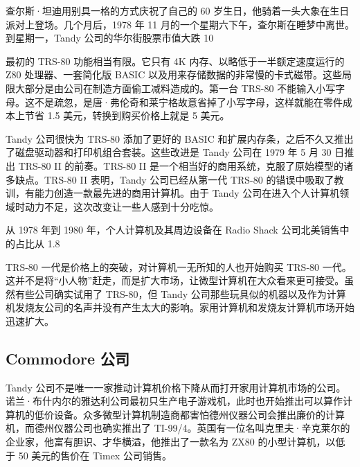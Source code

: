 \documentclass[12pt,UTF8]{ctexbook}
\begin{document}
查尔斯·坦迪用别具一格的方式庆祝了自己的 60 岁生日，他骑着一头大象在生日派对上登场。几个月后，1978 年 11 月的一个星期六下午，查尔斯在睡梦中离世。到星期一，Tandy 公司的华尔街股票市值大跌 10%

最初的 TRS-80 功能相当有限。它只有 4K 内存、以略低于一半额定速度运行的 Z80 处理器、一套简化版 BASIC 以及用来存储数据的非常慢的卡式磁带。这些局限大部分是由公司在制造方面偷工减料造成的。第一台 TRS-80 不能输入小写字母。这不是疏忽，是唐·弗伦奇和莱宁格故意省掉了小写字母，这样就能在零件成本上节省 1.5 美元，转换到购买价格上就是 5 美元。

Tandy 公司很快为 TRS-80 添加了更好的 BASIC 和扩展内存条，之后不久又推出了磁盘驱动器和打印机组合套装。这些改进是 Tandy 公司在 1979 年 5 月 30 日推出 TRS-80 II 的前奏。TRS-80 II 是一个相当好的商用系统，克服了原始模型的诸多缺点。TRS-80 II 表明，Tandy 公司已经从第一代 TRS-80 的错误中吸取了教训，有能力创造一款最先进的商用计算机。由于 Tandy 公司在进入个人计算机领域时动力不足，这次改变让一些人感到十分吃惊。

从 1978 年到 1980 年，个人计算机及其周边设备在 Radio Shack 公司北美销售中的占比从 1.8%

TRS-80 一代是价格上的突破，对计算机一无所知的人也开始购买 TRS-80 一代。这并不是将“小人物”赶走，而是扩大市场，让微型计算机在大众看来更可接受。虽然有些公司确实试用了 TRS-80，但 Tandy 公司那些玩具似的机器以及作为计算机发烧友公司的名声并没有产生太大的影响。家用计算机和发烧友计算机市场开始迅速扩大。





\subsection{Commodore 公司}


Tandy 公司不是唯一一家推动计算机价格下降从而打开家用计算机市场的公司。诺兰·布什内尔的雅达利公司最初只生产电子游戏机，此时也开始推出可以算作计算机的低价设备。众多微型计算机制造商都害怕德州仪器公司会推出廉价的计算机，而德州仪器公司也确实推出了 TI-99/4。英国有一位名叫克里夫·辛克莱尔的企业家，他富有胆识、才华横溢，他推出了一款名为 ZX80 的小型计算机，以低于 50 美元的售价在 Timex 公司销售。
\end{document}
